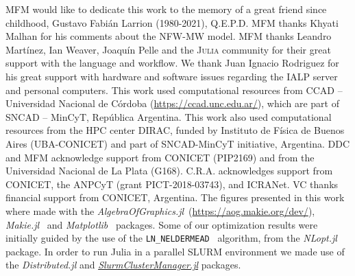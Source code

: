 \documentclass[twocolumn]{aa}
\begin{document}


\begin{acknowledgements}
    MFM would like to dedicate this work to the memory of a great friend since childhood, Gustavo Fabián Larrion (1980-2021), Q.E.P.D.
    MFM thanks Khyati Malhan for his comments about the NFW-MW model.
    MFM thanks Leandro Martínez, Ian Weaver, Joaquín Pelle and the \textsc{Julia} community for their
    great support with the language and workflow.
    We thank Juan Ignacio Rodriguez for his great support with hardware and
    software issues regarding the IALP server and personal computers.
    This work used computational resources from CCAD – Universidad
    Nacional de Córdoba (\href{https://ccad.unc.edu.ar/}{https://ccad.unc.edu.ar/}),
    which are part of SNCAD – MinCyT, República Argentina.
    This work also used computational resources from the HPC center DIRAC,
    funded by Instituto de Física de Buenos Aires (UBA-CONICET) and part of SNCAD-MinCyT initiative, Argentina.
    DDC and MFM acknowledge support from CONICET (PIP2169) and from the Universidad Nacional de La Plata (G168). C.R.A. acknowledges support from CONICET, the ANPCyT (grant PICT-2018-03743), and ICRANet. VC thanks financial support from CONICET, Argentina.
    The figures presented in this work where made with the
    {\it AlgebraOfGraphics.jl}~(\href{https://aog.makie.org/dev/}{https://aog.makie.org/dev/}),
    {\it Makie.jl}~\citep{DanischKrumbiegel2021} and {\it Matplotlib}~\citep{Hunter:2007}
    packages. Some of our optimization results were initially guided by the use of the \texttt{LN\_NELDERMEAD}~\citep{NELDERMEAD,10.1093/comjnl/8.1.42,shere} algorithm, from the {\it NLopt.jl}~\citep{NLopt} package.
    In order to run {\sc Julia} in a parallel SLURM environment we made use of the {\it Distributed.jl} and \href{https://github.com/kleinhenz/SlurmClusterManager.jl}{\it SlurmClusterManager.jl} packages. 
\end{acknowledgements}

%
%
%
\end{document}
